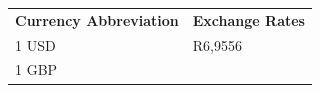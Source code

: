 {        \begin{center}
      
      \label{m39335*uid4}
      
    \noindent
      \tablelasttail{}
      \begin{xtabular*}{\mytablewidth}[t]{|p{10\mystarwidth}|p{10\mystarwidth}|}\hline
    
    
        
                    \textbf{Currency Abbreviation}
                   &
    
    
        
                    \textbf{Exchange Rates}
     \tabularnewline{}
    
    
        1 USD &
    
    
        R6,9556%
     \tabularnewline{}
    
    
        1 GBP &
    
    

\end{xtabular*}
\end{center}}
